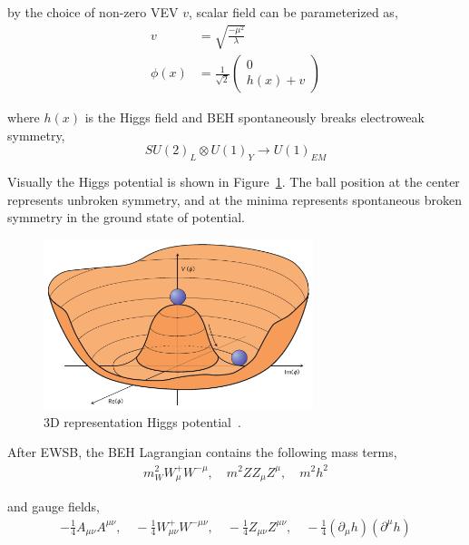 by the choice of non-zero \gls{VEV} \( v \), scalar field can be parameterized as,
%
\begin{align}
  v        & = \sqrt{\frac{- \mu^2}{\lambda}}                 \\
  \phi (x) & = \frac{1}{\sqrt{2}} \left( \begin{matrix}
                                             0 \\
                                             h (x) + v
                                           \end{matrix} \right)
\end{align}

where \( h(x) \) is the Higgs field and \gls{BEH} spontaneously breaks electroweak symmetry,
%
\begin{equation}
  {SU(2)}_L \otimes {U(1)}_Y \rightarrow {U(1)}_{EM}
\end{equation}

Visually the Higgs potential is shown in Figure~\ref{fig:higgs-potential}. The ball position
at the center represents unbroken symmetry, and at the minima represents spontaneous
broken symmetry in the ground state of potential.
%
\begin{figure}[!ht]
  \centering
  \includegraphics[width=0.7\textwidth]{figures/higgspotential.png}
  \caption[3D representation of Higgs potential]%
  {3D representation Higgs potential~\cite{image-higgs-potential}.}%
  \label{fig:higgs-potential}
\end{figure}

After \gls{EWSB}, the \gls{BEH} Lagrangian contains the following mass terms,
%
\begin{align}
  m^{2}_{W} W^{+}_{\mu} W^{- \mu}, \quad
  m^{2}{Z} Z_{\mu}Z^{\mu}, \quad m^{2} h^{2}
\end{align}

and gauge fields,
%
\begin{align}
  - \frac{1}{4} A_{\mu \nu} A^{\mu \nu}, \quad
  - \frac{1}{4} W^{+}_{\mu \nu} W^{- \mu \nu}, \quad
  - \frac{1}{4} Z_{\mu \nu} Z^{\mu \nu}, \quad
  - \frac{1}{4} {(\partial_{\mu} h)} {(\partial^{\mu} h)}
\end{align}

